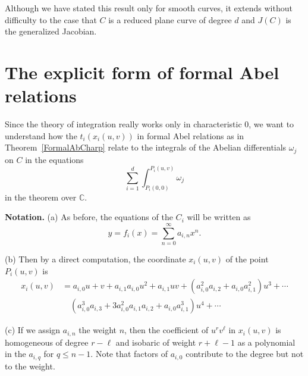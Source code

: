 \documentclass[12pt]{amsart}
\theoremstyle{theorem}
\newcommand{\CC}{\mathbb{C} }
\begin{document}
Although we have stated this result only for smooth curves, it extends without difficulty to the case
that $C$ is a reduced plane curve of degree $d$ and $J(C)$ is the generalized Jacobian.

\section{The explicit form of formal Abel relations}

Since the theory of integration really works only in characteristic $0$, we want to understand how the $t_i(x_i(u,v))$
in formal Abel relations as in Theorem~\ref{FormalAbCharp} relate to the integrals of the Abelian differentials $\omega_j$ on $C$ 
in the equations
$$\sum_{i=1}^d \int_{P_i(0,0)}^{P_i(u,v)} \omega_j$$
in the theorem over $\CC$.

\vskip 10pt
\noindent
{\bf Notation.}
\vskip 10pt
\noindent
(a) As before, the equations of the $C_i$ will be written as 
$$y = f_i(x) = \sum_{n=0}^\infty a_{i,n} x^n.$$

\vskip 10pt
\noindent
(b)  Then by a direct computation, the coordinate $x_i(u,v)$ of the point $P_i(u,v)$ is
\begin{align}
\label{firstterms}
x_i(u,v) &= a_{i,0} u + v + a_{i,1} a_{i,0} u^2 + a_{i,1} uv + (a_{i,0}^2 a_{i,2} + a_{i,0} a_{i,1}^2) u^3 + \cdots \\
             &\quad (a_{i,0}^3 a_{i,3} + 3 a_{i,0}^2 a_{i,1}a_{i,2} + a_{i,0} a_{i,1}^3) u^4 + \cdots  \nonumber
\end{align}

\vskip 10pt
\noindent
(c)  If we assign $a_{i,n}$ the weight $n$, then the coefficient of $u^r v^\ell$ in $x_i(u,v)$ is homogeneous of 
degree $r - \ell$ and isobaric of weight $r + \ell - 1$ as a polynomial in the $a_{i,q}$ for $q \le n - 1$.
Note that factors of $a_{i,0}$ contribute to the degree but not to the weight.
\end{document}
